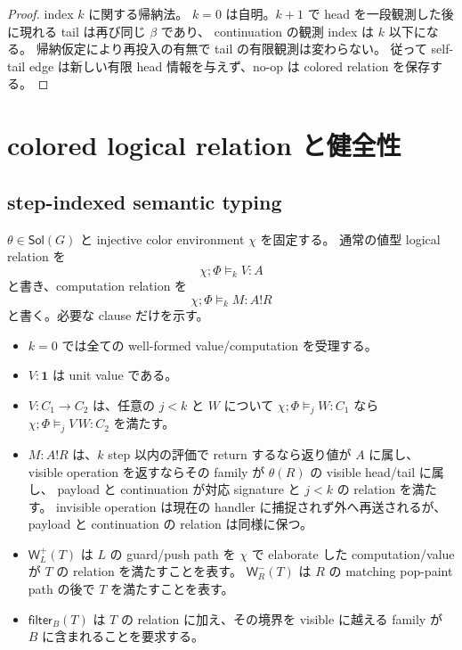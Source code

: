 \documentclass[uplatex,dvipdfmx,a4paper,10.5pt]{jsarticle}
\theoremstyle{jpplain}
\newcommand{\Unit}{\mathbf 1}
\newcommand{\Filter}[2]{\mathsf{filter}_{#1}(#2)}
\newcommand{\PWeight}[2]{\mathsf{W}^{+}_{#1}(#2)}
\newcommand{\NWeight}[2]{\mathsf{W}^{-}_{#1}(#2)}
\newcommand{\comp}{\mathbin{!}}
\newcommand{\sol}{\mathsf{Sol}}
\begin{document}
\begin{proof}
index $k$ に関する帰納法。
$k=0$ は自明。$k+1$ で head を一段観測した後に現れる tail は再び同じ $\beta$ であり、
continuation の観測 index は $k$ 以下になる。
帰納仮定により再投入の有無で tail の有限観測は変わらない。
従って self-tail edge は新しい有限 head 情報を与えず、no-op は colored relation を保存する。
\end{proof}

\section{colored logical relation と健全性}\label{sec:colored-soundness}

\subsection{step-indexed semantic typing}

$\theta\in\sol(G)$ と injective color environment $\chi$ を固定する。
通常の値型 logical relation を
\[
  \chi;\Phi\models_k V:A
\]
と書き、computation relation を
\[
  \chi;\Phi\models_k M:A\comp R
\]
と書く。必要な clause だけを示す。

\begin{itemize}
  \item $k=0$ では全ての well-formed value/computation を受理する。
  \item $V:\Unit$ は unit value である。
  \item $V:C_1\to C_2$ は、任意の $j<k$ と $W$ について
        $\chi;\Phi\models_j W:C_1$ なら
        $\chi;\Phi\models_j V\,W:C_2$ を満たす。
  \item $M:A\comp R$ は、$k$ step 以内の評価で return するなら返り値が $A$ に属し、
        visible operation を返すならその family が $\theta(R)$ の visible head/tail に属し、
        payload と continuation が対応 signature と $j<k$ の relation を満たす。
        invisible operation は現在の handler に捕捉されず外へ再送されるが、payload と continuation の relation は同様に保つ。
  \item $\PWeight{L}{T}$ は $L$ の guard/push path を $\chi$ で elaborate した computation/valueが $T$ の relation を満たすことを表す。
        $\NWeight{R}{T}$ は $R$ の matching pop-paint path の後で $T$ を満たすことを表す。
  \item $\Filter{B}{T}$ は $T$ の relation に加え、その境界を visible に越える family が $B$ に含まれることを要求する。
\end{itemize}
\end{document}
